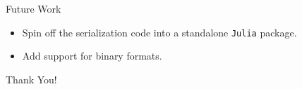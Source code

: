 \documentclass[9pt]{beamer}
\newcommand\Julia{\texttt{Julia}\xspace}
\begin{document}
\begin{frame}[fragile]{Future Work}
  \begin{itemize}\itemsep=\smallskipamount
  \item Spin off the serialization code into a standalone \Julia package.
    \vspace{3mm}
  \item Add support for binary formats.
    \vspace{3mm}
  \end{itemize}
  \vfill
  \pause
  \begin{center}
    \Large Thank You!
  \end{center}
\end{frame}
\end{document}
